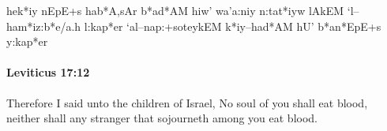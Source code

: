 			\begin{framed}
			\scriptsize
				\begin{compactdesc}
					\item[BHS] he{k*iy nEpE+s hab*A,sAr b*ad*AM hiw' wa'a:niy n:tat*iyw lAkEM `l--ham*iz:b*e/a.h l:kap*er `al--nap:+soteykEM k*iy--had*AM hU' b*an*EpE+s y:kap*er}
				\end{compactdesc}
			\end{framed}

		\paragraph{Leviticus 17:12} %
			\label{LEVITICUS-17-12}

			Therefore I said unto the children of Israel, No soul of you shall eat blood, neither shall any stranger that sojourneth among you eat blood.


